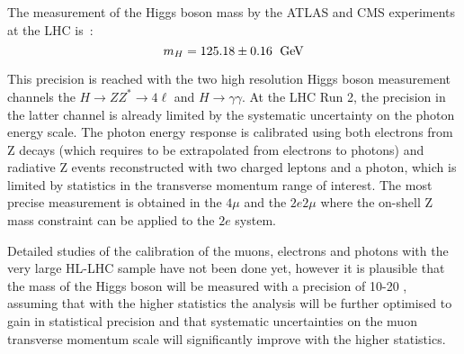 The measurement of the Higgs boson mass by the ATLAS and CMS
experiments at the LHC is~\cite{Tanabashi:2018oca}: $$m_H = 125.18 \pm
0.16 \; \rm ~\text{GeV}$$

This precision is reached with the two high resolution Higgs boson
measurement channels the $H\rightarrow ZZ^* \rightarrow 4\ell$ and
$H\rightarrow \gamma \gamma$. At the LHC Run 2, the precision in the
latter channel is already limited by the systematic uncertainty on the
photon energy scale. The photon energy response is calibrated using
both electrons from Z decays (which requires to be extrapolated from
electrons to photons) and radiative Z events reconstructed with two
charged leptons and a photon, which is limited by statistics in the
transverse momentum range of interest. The most precise measurement is
obtained in the $4\mu$ and the $2e2\mu$ where the on-shell Z mass
constraint can be applied to the $2e$ system. 


Detailed studies of the calibration of the muons, electrons and
photons with the very large HL-LHC sample have not been done yet,
however it is plausible that the mass of the Higgs boson will be
measured with a precision of 10-20 \UMeV, assuming that with the higher
statistics the analysis will be further optimised to gain in
statistical precision and that systematic uncertainties on the muon
transverse momentum scale will significantly improve with the higher
statistics.

